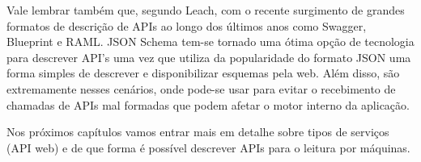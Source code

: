 Vale lembrar também que, segundo Leach, com o recente surgimento de grandes formatos de descrição de APIs ao longo dos últimos anos como Swagger, Blueprint e RAML. JSON Schema tem-se tornado uma ótima opção de tecnologia para descrever API's uma vez que utiliza da popularidade do formato JSON uma forma simples de descrever e disponibilizar esquemas pela web. Além disso, são extremamente nesses cenários, onde pode-se usar para evitar o recebimento de chamadas de APIs mal formadas que podem afetar o motor interno da aplicação. \cite{Leach2014} \cite{PezoaEtAl2016}

Nos próximos capítulos vamos entrar mais em detalhe sobre tipos de serviços (API web) e de que forma é possível descrever APIs para o leitura por máquinas.

